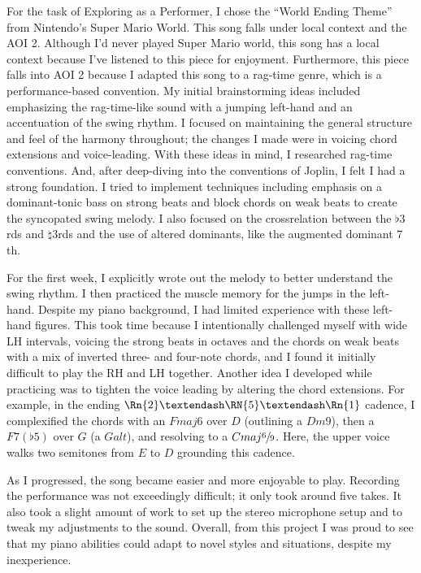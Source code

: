 \documentclass[12pt]{article}
\begin{document}
For the task of Exploring as a Performer, I chose the “World Ending Theme” from Nintendo's Super Mario World. This song falls under local context and the AOI 2. Although I'd never played Super Mario world, this song has a local context because I've listened to this piece for enjoyment. Furthermore, this piece falls into AOI 2 because I adapted this song to a rag-time genre, which is a performance-based convention. 
My initial brainstorming ideas included emphasizing the rag-time-like sound with a jumping left-hand and an accentuation of the swing rhythm. I focused on maintaining the general structure and feel of the harmony throughout; the changes I made were in voicing chord extensions and voice-leading. With these ideas in mind, I researched rag-time conventions. And, after deep-diving into the conventions of Joplin, I felt I had a strong foundation. I tried to implement techniques including emphasis on a dominant-tonic bass on strong beats and block chords on weak beats to create the syncopated swing melody. I also focused on the crossrelation between the $\flat 3$rds and $\natural 3$rds and the use of altered dominants, like the augmented dominant $7$th.
 
For the first week, I explicitly wrote out the melody to better understand the swing rhythm. I then practiced the muscle memory for the jumps in the left-hand. Despite my piano background, I had limited experience with these left-hand figures. This took time because I intentionally challenged myself with wide LH intervals, voicing the strong beats in octaves and the chords on weak beats with a mix of inverted three- and four-note chords, and I found it initially difficult to play the RH and LH together. Another idea I developed while practicing was to tighten the voice leading by altering the chord extensions. For example, in the ending $\Rn{2}–\RN{5}–\Rn{1}$ cadence, I complexified the chords with an $Fmaj6$ over $D$ (outlining a $Dm9$), then a $F7(\flat 5)$ over $G$ (a $Galt$), and resolving to a $Cmaj\sfrac{6}{9}$. Here, the upper voice walks two semitones from $E$ to $D$ grounding this cadence. 
 
As I progressed, the song became easier and more enjoyable to play. Recording the performance was not exceedingly difficult; it only took around five takes. It also took a slight amount of work to set up the stereo microphone setup and to tweak my adjustments to the sound. Overall, from this project I was proud to see that my piano abilities could adapt to novel styles and situations, despite my inexperience.
\end{document}
